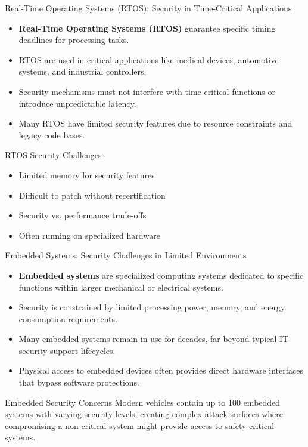 \documentclass{beamer}
\begin{document}
\begin{frame}{Real-Time Operating Systems (RTOS): Security in Time-Critical Applications}
\begin{itemize}
\item \textbf{Real-Time Operating Systems (RTOS)} guarantee specific timing deadlines for processing tasks.
\item RTOS are used in critical applications like medical devices, automotive systems, and industrial controllers.
\item Security mechanisms must not interfere with time-critical functions or introduce unpredictable latency.
\item Many RTOS have limited security features due to resource constraints and legacy code bases.
\end{itemize}

\begin{block}{RTOS Security Challenges}
\begin{itemize}
\item Limited memory for security features
\item Difficult to patch without recertification
\item Security vs. performance trade-offs
\item Often running on specialized hardware
\end{itemize}
\end{block}
\end{frame}

\begin{frame}{Embedded Systems: Security Challenges in Limited Environments}
    \begin{itemize}
    \item \textbf{Embedded systems} are specialized computing systems dedicated to specific functions within larger mechanical or electrical systems.
    \item Security is constrained by limited processing power, memory, and energy consumption requirements.
    \item Many embedded systems remain in use for decades, far beyond typical IT security support lifecycles.
    \item Physical access to embedded devices often provides direct hardware interfaces that bypass software protections.
    \end{itemize}
    
    \begin{alertblock}{Embedded Security Concerns}
    Modern vehicles contain up to 100 embedded systems with varying security levels, creating complex attack surfaces where compromising a non-critical system might provide access to safety-critical systems.
    \end{alertblock}
    \end{frame}
    
\end{document}
